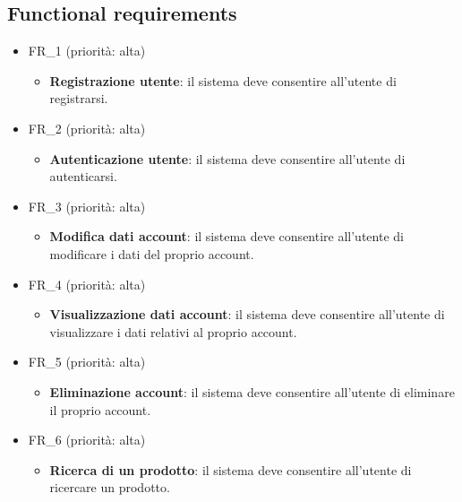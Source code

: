 \documentclass[12pt, a4paper, oneside]{book}
\begin{document}
    \subsection*{Functional requirements}
        \begin{itemize}
            \item FR\_1 (priorità: alta)
               \begin{itemize}
                   \item \textbf{Registrazione utente}: il sistema deve consentire all'utente di registrarsi.
                \end{itemize}
            \item FR\_2 (priorità: alta)
               \begin{itemize}
                   \item \textbf{Autenticazione utente}: il sistema deve consentire all'utente di autenticarsi.
                \end{itemize}
            \item FR\_3 (priorità: alta)
               \begin{itemize}
                   \item \textbf{Modifica dati account}: il sistema deve consentire all'utente di modificare i dati del proprio account.
                \end{itemize}
            \item FR\_4 (priorità: alta)
               \begin{itemize}
                   \item \textbf{Visualizzazione dati account}: il sistema deve consentire all'utente di visualizzare i dati relativi al proprio account.
                \end{itemize}
            \item FR\_5 (priorità: alta)
               \begin{itemize}
                   \item \textbf{Eliminazione account}: il sistema deve consentire all'utente di eliminare il proprio account.
                \end{itemize}
            \item FR\_6 (priorità: alta)
               \begin{itemize}
                   \item \textbf{Ricerca di un prodotto}: il sistema deve consentire all'utente di ricercare un prodotto.

\end{itemize}
\end{itemize}
\end{document}
